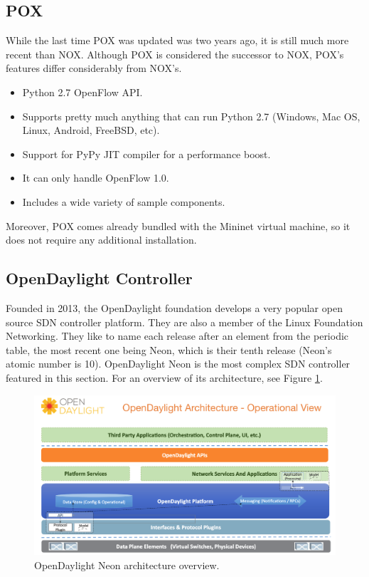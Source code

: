 \subsection{POX}
While the last time POX was updated was two years ago, it is still much more recent than NOX. Although POX is considered the successor to NOX, POX's features differ considerably from NOX's.
\begin{itemize}
    \item Python 2.7 OpenFlow API.
    \item Supports pretty much anything that can run Python 2.7 (Windows, Mac OS, Linux, Android, FreeBSD, etc).
    \item Support for PyPy JIT compiler for a performance boost.
    \item It can only handle OpenFlow 1.0.
    \item Includes a wide variety of sample components.
\end{itemize}

Moreover, POX comes already bundled with the Mininet virtual machine, so it does not require any additional installation. 

\subsection{OpenDaylight Controller}
Founded in 2013, the OpenDaylight foundation develops a very popular open source SDN controller platform. They are also a member of the Linux Foundation Networking. They like to name each release after an element from the periodic table, the most recent one being Neon, which is their tenth release (Neon's atomic number is 10). OpenDaylight Neon is the most complex SDN controller featured in this section. For an overview of its architecture, see Figure \ref{fig:opendaylight}.

\begin{figure}
  \centering
  \includegraphics[width=0.8\linewidth]{imagenes/StateOfTheArt/open_daylight.png}
  \caption[OpenDaylight Neon architecture overview.]{OpenDaylight Neon architecture overview\cite{opendaylight}.}
  \label{fig:opendaylight}
\end{figure}

